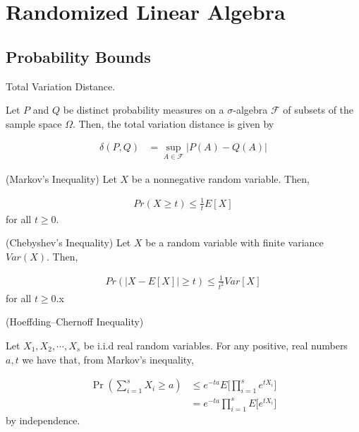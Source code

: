 \documentclass[main.tex]{subfiles}
\begin{document}
\section{Randomized Linear Algebra}

\subsection{Probability Bounds}

\begin{definition} Total Variation Distance.
\label{def:tve}

Let $P$ and $Q$ be distinct probability measures on a $\sigma$-algebra $\mathcal{F}$ of subsets of the sample space $\Omega$. Then, the total variation distance is given by

\begin{align*}
\delta(P, Q) &= \sup_{A \in \mathcal{F}}\vert P(A) - Q(A)\vert
\end{align*}
\end{definition}

\begin{proposition}(Markov's Inequality)
Let $X$ be a nonnegative random variable. Then, 

\begin{align*}
Pr(X \geq t) \leq \frac{1}{t} E[X]	
\end{align*}
for all $t \geq 0$.
\end{proposition}

\begin{proposition}(Chebyshev's Inequality)
Let $X$ be a random variable with finite variance $Var(X)$. Then, 

\begin{align*}
	Pr(|X - E[X]| \geq t) \leq \frac{1}{t^2} Var[X]	
\end{align*}
for all $t \geq 0$.x
\end{proposition}

\begin{proposition}(Hoeffding--Chernoff Inequality)
\label{lem:chernoff}

Let $X_1, X_2, \cdots, X_s$	be i.i.d real random variables. For any positive, real numbers $a, t$ we have that, from Markov's inequality,

\begin{align*}
\Pr(\sum_{i=1}^s X_i \geq a)
&\leq e^{-ta} E\Bigg[\prod_{i=1}^s e^{tX_i}\Bigg]\\
&= e^{-ta} \prod_{i=1}^s E\Bigg[e^{tX_i}\Bigg]
\end{align*}
by independence.

\end{proposition}
\end{document}
